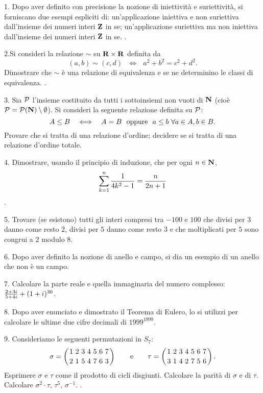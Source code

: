 \item{1.} 
Dopo aver definito con precisione la nozione di iniettivit\`a e suriettivit\`a, 
si forniscano due esempi espliciti di:\medskip
{} un'applicazione iniettiva e non
suriettiva dall'insieme dei numeri interi ${\bf Z}$ in se;\smallskip
{} un'applicazione suriettiva ma non iniettiva dall'insieme dei numeri interi ${\bf Z}$ in se.
.\ve\vs   %
\item{2.}Si consideri la relazione $\sim$ su ${\bf R}\times{\bf R}$ definita da
$$(a,b)\sim (c,d)\ \ \ \Longleftrightarrow\ \ \ a^2+b^2=c^2+d^2.$$
Dimostrare che $\sim$ \`e una relazione di equivalenza e se ne determinino le classi di equivalenza.
.\vv
\item{3.} 
Sia $\cal P$ l’insieme costituito da tutti i sottoinsiemi non vuoti di ${\bf N}$ (cio\`e
$\cal P =\cal P({\bf N}) \setminus\emptyset$). Si consideri la seguente relazione definita su $\cal P$:
$$A\leq B\ \ \ \Longleftrightarrow\ \ \ A = B {\ \ \rm oppure \ \ } a\leq b\ \forall a\in A, b\in B.$$
 Provare che si tratta di una relazione d'ordine;\smallskip
{} decidere se si tratta di una relazione d'ordine totale.\ve\vs   %
\item{4.} Dimostrare, usando il principio di induzione, che per ogni $n\in{\bf N}$, 
$$\sum_{k=1}^{n}{1\over 4k^2-1}={n\over 2n+1}$$
.\ve\vs   %
\item{5.} Trovare (se esistono) tutti gli interi compresi tra $-100$ e $100$ che
divisi per $3$ danno come resto $2$, divisi per $5$ danno come resto $3$ e
che moltiplicati per $5$ sono congrui a $2$ modulo $8$.\vv
\item{6.} Dopo aver definito la nozione di anello e campo, si dia un esempio di un anello che non \`e
un campo.\ve\vs   %
\item{7.} Calcolare la parte reale e quella immaginaria del numero complesso:
${2+3i\over 5+4i}+(1+i)^{30}$.\ve \vs  %
\item{8.} Dopo aver enunciato e dimostrato il Teorema di Eulero, lo si utilizzi
per calcolare le ultime due cifre decimali di $1999^{1999}$.\vskip5cm \vv

\item{9.} Consideriamo le seguenti permutazioni in $S_7$:
$$\sigma=\left({1\ 2\ 3\ 4\ 5\ 6\ 7\atop 2\ 1\ 5\ 4\ 7\ 6\ 3}\right)\qquad{\rm e}\qquad 
\tau=\left({1\ 2\ 3\ 4\ 5\ 6\ 7\atop 3\ 1\ 4\ 2\ 7\ 5\ 6}\right).$$ 
 Esprimere $\sigma$ e $\tau$ come il prodotto di cicli disgiunti.\medskip
{} Calcolare la parit\`a di $\sigma$ e di $\tau$.\medskip
{} Calcolare $\sigma^2\cdot\tau$, $\tau^5$, $\sigma^{-1}$.
.  \ \vst %
\bye
